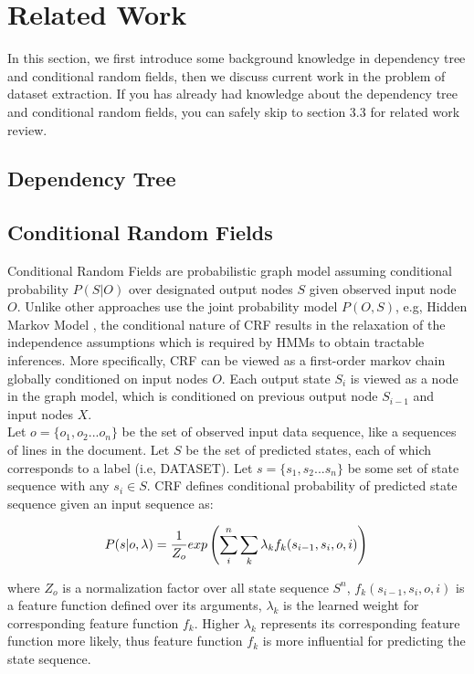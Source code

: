 \documentclass[10pt]{article}
\begin{document}
\section{Related Work}
In this section, we first introduce some background knowledge in dependency tree and conditional random fields, then we discuss current work in the problem of dataset extraction. If you has already had knowledge about the dependency tree and conditional random fields, you can safely skip to section 3.3 for related work review.
\subsection{Dependency Tree}

\subsection{Conditional Random Fields}
Conditional Random Fields \cite{lafferty2001conditional} are probabilistic graph model assuming conditional probability $P(S|O)$ over designated output nodes $S$ given observed input node $O$. Unlike other approaches use the joint probability model $P(O,S)$, e.g, Hidden Markov Model \cite{eddy1996hidden}, the conditional nature of CRF results in the relaxation of the independence assumptions which is required by HMMs to obtain tractable inferences. More specifically, CRF can be viewed as a first-order markov chain globally conditioned on input nodes $O$. Each output state $S_i$ is viewed as a node in the graph model, which is conditioned on previous output node $S_{i-1}$ and input nodes $X$. \\

Let $o =\{o_1, o_2 ... o_n \}$ be the set of observed input data sequence, like a sequences of lines in the document. Let $S$ be the set of predicted states, each of which corresponds to a label (i.e, DATASET). Let $s = \{ s_1, s_2 ... s_n\}$ be some set of state sequence with any $s_i \in S$. CRF defines conditional probability of predicted state sequence given an input sequence as: 

\[
P(s | o,\lambda) = \frac{1}{Z_o} exp \left( \sum_{i}^n \sum_{k} \lambda_{k} f_{k}(s_{i-1}, s_{i}, o, i) \right)  \\
\]

where $Z_o$ is a normalization factor over all state sequence $S^n$, $f_{k}(s_{i-1}, s_{i}, o, i)$ is a feature function defined over its arguments, $\lambda_{k}$ is the learned weight for corresponding feature function $f_k$. Higher $\lambda_{k}$ represents its corresponding feature function more likely, thus feature function $f_k$ is more influential for predicting the state sequence. \\
\end{document}
